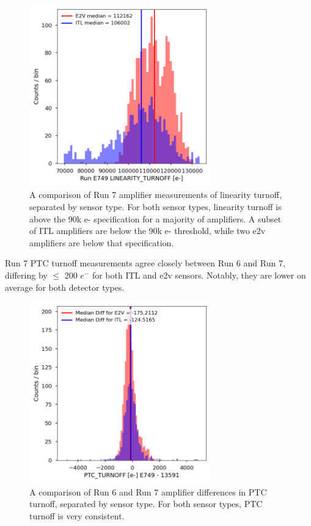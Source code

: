\begin{figure}[ht]
\begin{centering}
\includegraphics[width=0.7\textwidth]{figures/baselineCharacterization/LINEARITY_TURNOFF_E749_sensorType.png}
\caption{A comparison of Run 7 amplifier measurements of linearity turnoff, separated by sensor type. For both sensor types, linearity turnoff is above the 90k e- specification for a majority of amplifiers. A subset of ITL amplifiers are below the 90k e- threshold, while two e2v amplifiers are below that specification.}
\end{centering}
\end{figure}

Run 7 PTC turnoff measurements agree closely between Run 6 and Run 7, differing by $\leq$ 200 $e^-$ for both ITL and e2v sensors. Notably, they are lower on average for both detector types.

\begin{figure}[ht]
\begin{centering}
\includegraphics[width=0.7\textwidth]{figures/baselineCharacterization/PTC_TURNOFF_13591_E749_diff.png}
\caption{A comparison of Run 6 and Run 7 amplifier differences in PTC turnoff, separated by sensor type. For both sensor types, PTC turnoff is very consistent.}
\end{centering}
\end{figure}

